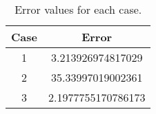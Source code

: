 \begin{table}[htbp]
	 \centering
	 \caption{Error values for each case.}
	 \begin{tabular}{cc}
		 \toprule
		 Case & Error \\ 
		 \midrule 
		 1 & 3.213926974817029 \\ 
		 2 & 35.33997019002361 \\ 
		 3 & 2.1977755170786173 \\ 
		 \bottomrule 
	 \end{tabular} 
	 \label{tab:error} 
\end{table}